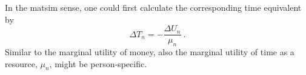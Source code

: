 In the \acrshort{matsim} sense, one could first calculate the corresponding time equivalent 
%
by
%
\begin{equation}
\label{eq:ch:economicEval:monetizationTime}
\Delta T_n =  - \frac{\Delta U_n}{\mu_n} \ .
\end{equation}
%
Similar to the marginal utility of money, also the marginal utility of time as a resource, $\mu_n$, might be person-specific.
%
%

